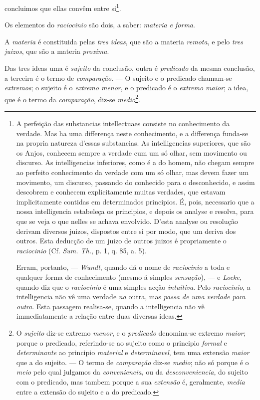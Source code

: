 concluimos que ellas convêm entre si\footnote{A perfeição das substancias intellectuaes
consiste no conhecimento da verdade. Mas ha uma differença neste conhecimento, e a
differença funda-se na propria natureza d'essas substancias. As intelligencias
superiores, que são os Anjos, conhecem sempre a verdade cum um só olhar, sem movimento ou
discurso. As intelligencias inferiores, como é a do homem, não chegam sempre ao perfeito
conhecimento da verdade com um só olhar, mas devem fazer um movimento, um discurso,
passando do conhecido para o desconhecido, e assim descobrem e conhecem explicitamente
muitas verdades, que estavam implicitamente contidas em determinados principios. É, pois,
necessario que a nossa intelligencia estabeleça os principios, e depois os analyse e
resolva, para que se veja o que nelles se achava envolvido. D'esta analyse ou resolução
derivam diversos juizos, dispostos entre si por modo, que um deriva dos outros. Esta
deducção de um juizo de outros juizos é propriamente o \emph{raciocinio} (Cf.
\emph{Sum. Th.}, p. 1, q. 85, a. 5).

Erram, portanto, --- \emph{Wundt}, quando dá o nome de \emph{raciocinio} a toda e qualquer
forma de conhecimento (mesmo á simples \emph{sensação}), --- e \emph{Locke}, quando diz
que o \emph{raciocinio} é uma simples acção \emph{intuitiva}. Pelo \emph{raciocinio}, a
intelligencia não vê uma verdade \emph{na} outra, mas \emph{passa de uma verdade para
outra}. Esta passagem realisa-se, quando a intelligencia não vê immediatamente a relação
entre duas diversas ideas.}.

 Os elementos do \emph{raciocinio} são dois, a saber:
\emph{materia e forma}.

 A \emph{materia} é constituida pelas \emph{tres ideas}, que são a materia
\emph{remota}, e pelo \emph{tres juizos}, que são a materia \emph{proxima}.

Das tres ideas uma é \emph{sujeito} da conclusão, outra é \emph{predicado} da mesma
conclusão, a terceira é o termo de \emph{comparação}. --- O sujeito e o predicado
chamam-se \emph{extremos}; o sujeito é o \emph{extremo menor}, e o predicado é o
\emph{extremo maior}; a idea, que é o termo da \emph{comparação}, diz-se
\emph{medio}\footnote{O \emph{sujeito} diz-se extremo \emph{menor}, e o \emph{predicado}
denomina-se extremo \emph{maior}; porque o predicado, referindo-se ao sujeito como o
principio \emph{formal} e \emph{determinante} ao principio \emph{material} e
\emph{determinavel}, tem uma extensão \emph{maior} que a do sujeito. --- O termo de
\emph{comparação} diz-se \emph{medio}; não só porque é o \emph{meio} pelo qual julgamos da
\emph{conveniencia}, ou da \emph{desconveniencia}, do sujeito com o predicado, mas tambem
porque a sua \emph{extensão} é, geralmente, \emph{media} entre a extensão do sujeito e a
do predicado.}.

